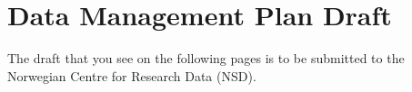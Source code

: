 \section{Data Management Plan Draft}

\label{app:nsd}

The draft that you see on the following pages is to be submitted to
the Norwegian Centre for Research Data (NSD).


